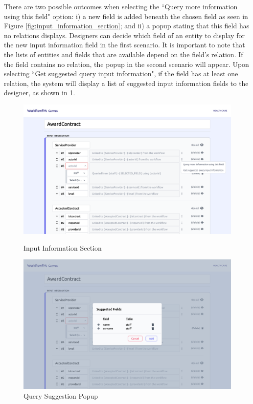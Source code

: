 There are two possible outcomes when selecting the ``Query more information using this field" option: i) a new field is added beneath the chosen field as seen in Figure \ref{fig:input_information_section}; and ii) a popup stating that this field has no relations displays. Designers can decide which field of an entity to display for the new input information field in the first scenario. It is important to note that the lists of entities and fields that are available depend on the field's relation. If the field contains no relation, the popup in the second scenario will appear. Upon selecting ``Get suggested query input information", if the field has at least one relation, the system will display a list of suggested input information fields to the designer, as shown in \ref{fig:query_suggestion}.

\begin{figure}[ht!]
\centering
\begin{minipage}{.5\textwidth}
  \centering
  \includegraphics[width=0.9\linewidth]{overleaf/images/screens/input_information_section.png}
  \caption{Input Information Section}
  \label{fig:input_information_section}
\end{minipage}%
\begin{minipage}{.5\textwidth}
  \centering
  \includegraphics[width=0.9\linewidth]{overleaf/images/screens/query_suggestion.png}
  \caption{Query Suggestion Popup}
  \label{fig:query_suggestion}
\end{minipage}
\end{figure}


